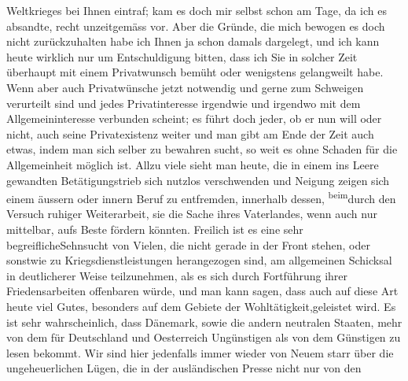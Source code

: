{\begin{ledgroupsized}[t]{13cm}
                    Weltkrieges bei Ihnen eintraf; kam es doch mir selbst schon am Tage, da ich es
                    absandte, recht unzeitgemäss vor. Aber die Gründe, die mich bewogen es doch
                    nicht zurückzuhalten habe ich Ihnen ja 
               schon damals dargelegt\introOben{},\introOben{} und ich kann heute wirklich nur um Entschuldigung
                    bitten, dass ich Sie in solcher Zeit überhaupt mit einem Privatwunsch bemüht
                    oder wenigstens gelangweilt habe. Wenn aber auch Privatwünsche jetzt notwendig
                    und gerne zum Schweigen verurteilt sind und jedes Privatinteresse irgendwie und
                    irgendwo mit dem Allgemeininteresse verbunden scheint; es führt {\pb}doch jeder, ob er nun will oder nicht, auch
                    seine Privatexistenz weiter und man gibt am Ende der Zeit auch etwas, indem man
                    sich selber zu bewahren sucht, so weit es ohne Schaden für die Allgemeinheit
                    möglich ist. Allzu viele sieht man heute, die in einem ins Leere gewandten
                    Betätigungstrieb sich nutzlos verschwenden und Neigung zeigen sich einem äussern
                    oder innern Beruf zu entfremden, innerhalb dessen, \substVorne{}\textsuperscript{beim}\substDazwischen{}durch den\substHinten{} Versuch ruhiger Weiterarbeit, sie die Sache ihres Vaterlandes, wenn
                    auch nur mittelbar, aufs Beste fördern könnten. Freilich ist \introOben{}es eine sehr begreifliche\introOben{}Sehnsucht
                    von Vielen, die nicht gerade in der Front stehen, oder sonstwie zu
                    Kriegsdienstleistungen herangezogen sind, am allgemeinen Schicksal in
                    deutlicherer Weise teilzunehmen, als es sich durch Fortführung ihrer
                    Friedensarbeiten offenbaren würde, und man kann sagen, dass auch auf diese Art
                    heute viel Gutes, besonders auf dem Gebiete der Wohltätigkeit,geleistet
                    wird.\pend
           \pstart
           Es ist sehr wahrscheinlich, dass {\pb}Dänemark, sowie die andern neutralen Staaten,
                    mehr von dem für Deutschland und Oesterreich Ungünstigen als von dem Günstigen
                    zu lesen bekommt. Wir sind hier jedenfalls immer wieder von Neuem starr über die
                    ungeheuerlichen Lügen, die in der ausländischen Presse nicht nur von den

\end{ledgroupsized}}
